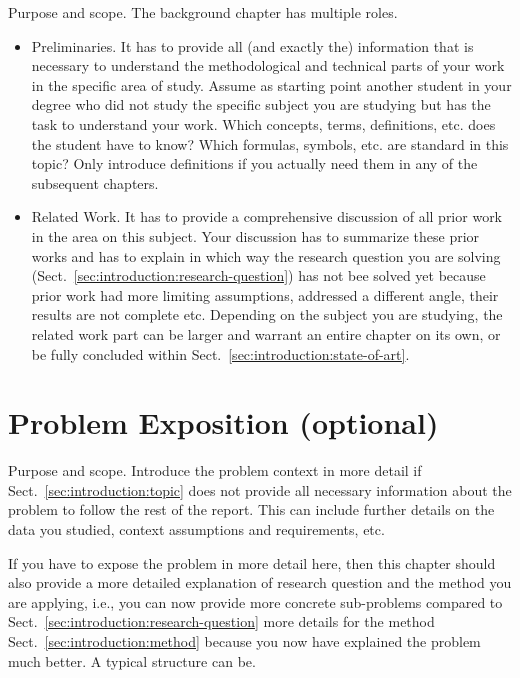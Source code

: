\documentclass[12pt,a4paper,footinclude=true,twoside,headinclude=true]{report}
\begin{document}
\textsf{Purpose and scope}. The background chapter has multiple roles.
\begin{itemize}

    \item \textsf{Preliminaries.} It has to provide all (and exactly the) information that is necessary to understand the methodological and technical parts of your work in the specific area of study. Assume as starting point another student in your degree who did not study the specific subject you are studying but has the task to understand your work. Which concepts, terms, definitions, etc. does the student have to know? Which formulas, symbols, etc. are standard in this topic? Only introduce definitions if you actually need them in any of the subsequent chapters.
    
    \item \textsf{Related Work.} It has to provide a comprehensive discussion of all prior work in the area on this subject. Your discussion has to summarize these prior works and has to explain in which way the research question you are solving (Sect.~\ref{sec:introduction:research-question}) has not bee solved yet because prior work had more limiting assumptions, addressed a different angle, their results are not complete etc. Depending on the subject you are studying, the related work part can be larger and warrant an entire chapter on its own, or be fully concluded within Sect.~\ref{sec:introduction:state-of-art}.
\end{itemize}

\chapter{Problem Exposition (optional)}\label{sec:problem-exposition}

\textsf{Purpose and scope}. Introduce the problem context in more detail if Sect.~\ref{sec:introduction:topic} does not provide all necessary information about the problem to follow the rest of the report. This can include further details on the data you studied, context assumptions and requirements, etc. 

If you have to expose the problem in more detail here, then this chapter should also provide a more detailed explanation of research question and the method you are applying, i.e., you can now provide more concrete sub-problems compared to Sect.~\ref{sec:introduction:research-question} more details for the method Sect.~\ref{sec:introduction:method} because you now have explained the problem much better. A typical structure can be.
\end{document}
